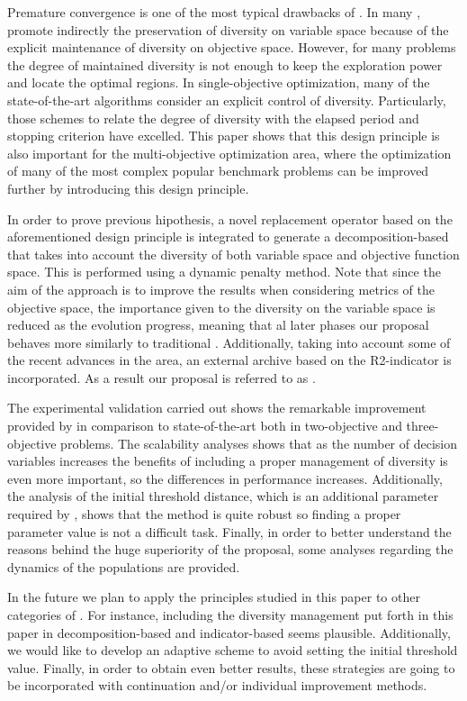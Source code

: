 Premature convergence is one of the most typical drawbacks of \EAS{}.
%
In many \MOPS{}, \MOEAS{} promote indirectly the preservation of diversity on variable space
because of the explicit maintenance of diversity on objective space.
%
However, for many problems the degree of maintained diversity is not enough to keep the exploration
power and locate the optimal regions.
%
In single-objective optimization, many of the state-of-the-art algorithms consider an explicit control of
diversity.
%
Particularly, those schemes to relate the degree of diversity with the elapsed period and stopping criterion
have excelled.
%
This paper shows that this design principle is also important for the multi-objective optimization area,
where the optimization of many of the most complex popular benchmark problems can be improved further
by introducing this design principle.

In order to prove previous hipothesis, a novel replacement operator based on the aforementioned design principle
is integrated to generate a decomposition-based \MOEA{} that takes into account the diversity of both variable 
space and objective function space.
%
This is performed using a dynamic penalty method. 
%
Note that since the aim of the approach is to improve the results when considering metrics of the objective space,
the importance given to the diversity on the variable space is reduced as the evolution progress, meaning that
al later phases our proposal behaves more similarly to traditional \MOEAS{}.
%
Additionally, taking into account some of the recent advances in the area, an external archive based on the
R2-indicator is incorporated.
%
As a result our proposal is referred to as \AVSDMOEAD{}.
%

The experimental validation carried out shows the remarkable improvement provided by \AVSDMOEAD{} in comparison to
state-of-the-art \MOEAS{} both in two-objective and three-objective problems.
%
The scalability analyses shows that as the number of decision variables increases the benefits of including
a proper management of diversity is even more important, so the differences in performance increases.
%
Additionally, the analysis of the initial threshold distance, which is an additional parameter required by \AVSDMOEAD{}, 
shows that the method is quite robust so finding a proper parameter value is not a difficult task.
%
Finally, in order to better understand the reasons behind the huge superiority of the proposal, some analyses regarding
the dynamics of the populations are provided.

In the future we plan to apply the principles studied in this paper to other categories of \MOEAS{}.
%
For instance, including the diversity management put forth in this paper in decomposition-based and indicator-based \MOEAS{} seems plausible.
%
Additionally, we would like to develop an adaptive scheme to avoid setting the initial threshold value.
%
Finally, in order to obtain even better results, these strategies are going to be incorporated with continuation and/or individual
improvement methods.
